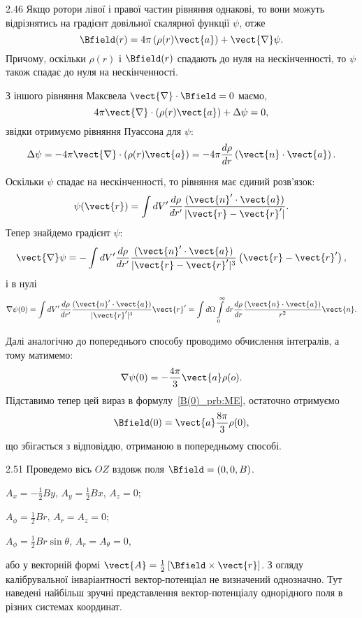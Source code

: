 \begin{Solution}{2.{46}}
	Якщо ротори лівої і правої частин рівняння однакові, то вони можуть відрізнятись на градієнт довільної скалярної функції $\psi$, отже
	\begin{equation}\label{B(0)_prb:ME}
		\Bfield(r) = 4\pi \left( \rho(r) \vect{a}\right) + \vect{\nabla}\psi.
	\end{equation}
	Причому, оскільки $\rho(r)$   і $\Bfield(r)$  спадають до нуля на нескінченності,  то $\psi$  також спадає до нуля на нескінченності.

	З іншого рівняння Максвела $\vect{\nabla} \cdot \Bfield = 0$ маємо,
	\[
		4\pi \vect{\nabla} \cdot \left( {\rho (r){\vect{a}}} \right) + \Delta \psi  = 0,
	\]
	звідки отримуємо рівняння Пуассона для $\psi$:
	\[
		\Delta \psi = - 4\pi \vect{\nabla} \cdot \left( {\rho (r){\vect{a}}} \right) = - 4\pi\frac{d\rho}{dr} \left( \vect{n} \cdot \vect{a} \right).
	\]

	Оскільки $\psi$ спадає на нескінченності, то рівняння має єдиний розв'язок:
	\[
		\psi (\vect{r}) = \int dV' \frac{d\rho}{dr'}\frac{(\vect{n}'\cdot \vect{a})}{|\vect{r} - \vect{r}'|}.
	\]
	Тепер знайдемо градієнт $\psi$:
	\[
		\vect{\nabla}\psi = - \int {dV'} \frac{d\rho}{dr'}\frac{(\vect{n}' \cdot \vect{a})}{|\vect{r} - \vect{r}'|^3}\left( {\vect{r} - \vect{r}'} \right),
	\]
	і в нулі
	\[
		\nabla \psi (0) = \int dV' \frac{d\rho}{dr'}\frac{(\vect{n}' \cdot \vect{a})}{|\vect{r}'|^3} \vect{r}'= \int {d\Omega} \int\limits_0^\infty  dr \frac{d\rho}{dr}\frac{(\vect{n} \cdot \vect{a})}{r^2}{\vect{n}}.
	\]

	Далі аналогічно до попереднього способу проводимо обчислення інтегралів, а тому матимемо:
	\[
		\nabla \psi (0) = -\frac{4\pi}{3}\vect{a}\rho(o).
	\]
	Підставимо тепер цей вираз в формулу~\eqref{B(0)_prb:ME}, остаточно отримуємо
	\[
		\Bfield(0) = \vect{a}\frac{8\pi}{3}\rho(0),
	\]
	що збігається з відповіддю, отриманою в попередньому способі.
\end{Solution}
\begin{Solution}{2.{51}}
	Проведемо вісь $OZ$ вздовж поля $\Bfield = (0, 0, B)$.
	\begin{enumerate*}[label=\alph*)]
		\item $A_x = -\frac12 By$, $A_y = \frac12 Bx$, $A_z = 0$;
		\item $A_{\phi} = \frac12 Br$, $A_r = A_z = 0$;
		\item $A_{\phi} = \frac12 Br\sin\theta$, $A_r = A_{\theta} = 0$,
	\end{enumerate*}
або у векторній формі 	$\vect{A} = \frac12 \left[ \Bfield\times \vect{r} \right] $.
	З огляду калібрувальної інваріантності вектор-потенціал не визначений однозначно. Тут наведені найбільш зручні представлення вектор-потенціалу однорідного поля в різних системах координат.
\end{Solution}
